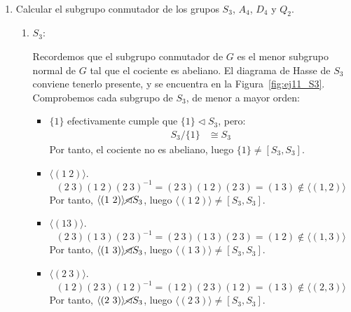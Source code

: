 \begin{ejercicio}~\label{ej:4.34}
    \begin{enumerate}
        \item Calcular el subgrupo conmutador de los grupos $S_3$, $A_4$, $D_4$ y $Q_2$.
        \begin{enumerate}
            \item $S_3$:
            
            Recordemos que el subgrupo conmutador de $G$ es el menor subgrupo normal de $G$ tal que el cociente es abeliano. El diagrama de Hasse de $S_3$ conviene tenerlo presente, y se encuentra en la Figura~\ref{fig:ej11_S3}. Comprobemos cada subgrupo de $S_3$, de menor a mayor orden:
            \begin{itemize}
                \item $\{1\}$ efectivamente cumple que $\{1\}\lhd S_3$, pero:
                \begin{align*}
                    S_3/\{1\} &\cong S_3
                \end{align*}
                Por tanto, el cociente no es abeliano, luego $\{1\}\neq [S_3,S_3]$.

                \item $\langle (1\ 2)\rangle$.
                \begin{equation*}
                    (2\ 3)(1\ 2)(2\ 3)^{-1} = (2\ 3)(1\ 2)(2\ 3) = (1\ 3)\notin \langle (1,2)\rangle
                \end{equation*}
                Por tanto, $\langle (1\ 2)\rangle \cancel{\lhd} S_3$, luego $\langle (1\ 2)\rangle \neq [S_3,S_3]$.

                \item $\langle (1 3)\rangle$.
                \begin{equation*}
                    (2\ 3)(1\ 3)(2\ 3)^{-1} = (2\ 3)(1\ 3)(2\ 3) = (1\ 2)\notin \langle (1,3)\rangle
                \end{equation*}
                Por tanto, $\langle (1\ 3)\rangle \cancel{\lhd} S_3$, luego $\langle (1\ 3)\rangle \neq [S_3,S_3]$.

                \item $\langle (2\ 3)\rangle$.
                \begin{equation*}
                    (1\ 2)(2\ 3)(1\ 2)^{-1} = (1\ 2)(2\ 3)(1\ 2) = (1\ 3)\notin \langle (2,3)\rangle
                \end{equation*}
                Por tanto, $\langle (2\ 3)\rangle \cancel{\lhd} S_3$, luego $\langle (2\ 3)\rangle \neq [S_3,S_3]$.


\end{itemize}
\end{enumerate}
\end{enumerate}
\end{ejercicio}
